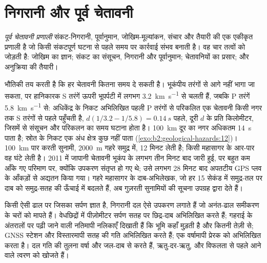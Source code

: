 \section{निगरानी और पूर्व चेतावनी}\label{sec:b2:geological-hazards:warning}

\begin{definition}[पूर्व चेतावनी प्रणाली]\label{def:b2:geological-hazards:warning}
\emph{पूर्व चेतावनी प्रणाली} संकट-निगरानी,
पूर्वानुमान, जोखिम-मूल्यांकन, संचार और तैयारी की एक एकीकृत प्रणाली है जो किसी
संकटपूर्ण घटना से पहले समय पर कार्रवाई संभव बनाती है। वह चार तत्वों को जोड़ती है: जोखिम का ज्ञान; संकट का संसूचन,
निगरानी और पूर्वानुमान; चेतावनियों का प्रसार; और अनुक्रिया की
तैयारी।
\end{definition}

भौतिकी तय करती है कि हर चेतावनी कितना समय दे सकती है। भूकंपीय तरंगों से आगे नहीं भागा जा सकता, पर हानिकारक
S तरंगें ऊपरी भूपर्पटी में लगभग \qty{3.2}{km.s^{-1}} से चलती हैं, जबकि
P तरंगें \qty{5.8}{km.s^{-1}} से: अधिकेंद्र के निकट अभिलिखित पहली P तरंगों से परिकलित एक चेतावनी किसी नगर तक
S तरंगों से पहले पहुँचती है, $d(1/3.2 - 1/5.8) = \qty{0.14}{s}$ पहले, दूरी $d$ के प्रति किलोमीटर, जिसमें से
संसूचन और परिकलन का समय घटाना होता है। \qty{100}{km} दूर का नगर अधिकतम \qty{14}{s} पाता है; स्रोत के निकट एक
अंध क्षेत्र कुछ नहीं पाता (\cref{exo:b2:geological-hazards:12})। \qty{100}{km}
पार करती सुनामी, \qty{2000}{m} गहरे समुद्र में, 12 मिनट लेती है; किसी महासागर के आर-पार वह घंटे लेती है। 2011 में जापानी
चेतावनी भूकंप के लगभग तीन मिनट बाद जारी हुई, पर बहुत कम आँके गए परिमाण पर,
क्योंकि उपकरण संतृप्त हो गए थे; उसे लगभग 28 मिनट बाद अपतटीय GPS प्लव के आँकड़ों से अद्यतन किया गया।
गहरे महासागर के दाब-अभिलेखक, जो हर 15 सेकंड में समुद्र-तल पर दाब को
समुद्र-सतह की ऊँचाई में बदलते हैं, अब गुज़रती सुनामियों की सूचना उपग्रह द्वारा देते हैं।

\begin{inthefield}[एक ढाल को खिसकते देखना]
किसी ऐसी ढाल पर जिसका सर्पण ज्ञात है, निगरानी दल ऐसे उपकरण लगाते हैं जो
अनंत-ढाल समीकरण के चरों को मापते हैं। वेधछिद्रों में पीज़ोमीटर सर्पण सतह पर छिद्र-दाब अभिलिखित करते हैं;
गहराई के अंतरालों पर पढ़ी जाने वाली नतिमापी नलिकाएँ दिखाती हैं कि भूमि कहाँ मुड़ती है और कितनी तेज़ी से; GNSS
स्टेशन और विस्तारमापी सतह की गति अभिलिखित करते हैं; एक वर्षामापी प्रेरक को अभिलिखित करता है।
दल गति की तुलना वर्षा और जल-दाब से करते हैं, ऋतु-दर-ऋतु, और विफलता से पहले आने वाले
त्वरण को खोजते हैं।
\end{inthefield}

